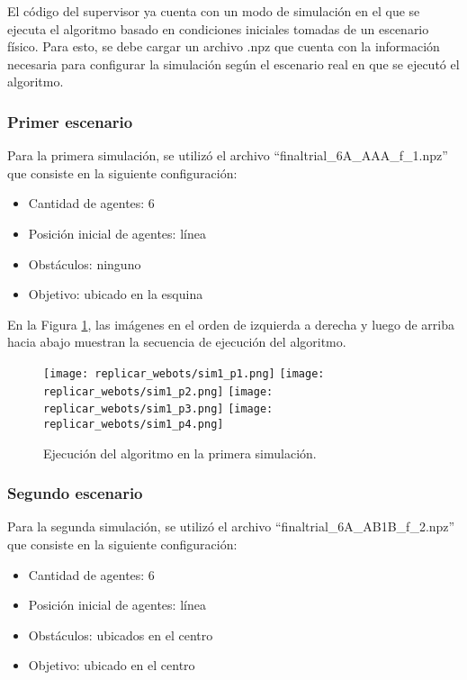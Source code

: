 El código del supervisor ya cuenta con un modo de simulación en el que se ejecuta el algoritmo basado en condiciones iniciales tomadas de un escenario físico. Para esto, se debe cargar un archivo .npz que cuenta con la información necesaria para configurar la simulación según el escenario real en que se ejecutó el algoritmo.

\subsubsection{Primer escenario}
Para la primera simulación, se utilizó el archivo ``finaltrial\_6A\_AAA\_f\_1.npz'' que consiste en la siguiente configuración:

\begin{itemize}
	\item Cantidad de agentes: 6
	\item Posición inicial de agentes: línea
	\item Obstáculos: ninguno
	\item Objetivo: ubicado en la esquina
\end{itemize}

En la Figura \ref{fig:primera_simulacion}, las imágenes en el orden de izquierda a derecha y luego de arriba hacia abajo muestran la secuencia de ejecución del algoritmo.

\begin{figure}[H]
	\centering
	\texttt{[image: replicar\_webots/sim1\_p1.png]}
	\texttt{[image: replicar\_webots/sim1\_p2.png]}
	\texttt{[image: replicar\_webots/sim1\_p3.png]}
	\texttt{[image: replicar\_webots/sim1\_p4.png]}
	\caption{Ejecución del algoritmo en la primera simulación.}
	\label{fig:primera_simulacion}
\end{figure}

\subsubsection{Segundo escenario}
Para la segunda simulación, se utilizó el archivo ``finaltrial\_6A\_AB1B\_f\_2.npz'' que consiste en la siguiente configuración:

\begin{itemize}
	\item Cantidad de agentes: 6
	\item Posición inicial de agentes: línea
	\item Obstáculos: ubicados en el centro
	\item Objetivo: ubicado en el centro
\end{itemize}

